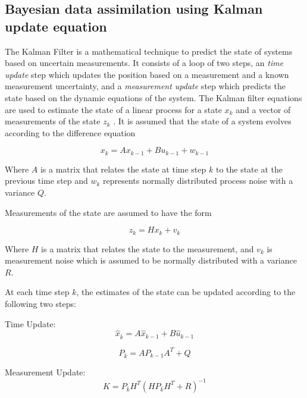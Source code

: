 \subsection{Bayesian data assimilation using Kalman update equation}\label{subsec:kalman-update}

The Kalman Filter is a mathematical technique to predict the state of systems based on uncertain measurements. It consists of a loop of two steps, an \emph{time update} step which updates the position based on a measurement and a known measurement uncertainty, and a \emph{measurement update} step which predicts the state based on the dynamic equations of the system. The Kalman filter equations are used to estimate the state of a linear process for a state $x_k$ and a vector of measurements of the state $z_k$ \parencite{Welch2021a}.  It is assumed that the state of a system evolves according to the difference equation

\begin{equation}
 x_k = Ax_{k-1} + Bu_{k-1} + w_{k-1}   
\end{equation}

Where $A$ is a matrix that relates the state at time step $k$ to the state at the previous time step and $w_k$ represents normally distributed process noise with a variance $Q$.  

Measurements of the state are assumed to have the form

\begin{equation}
    z_k = Hx_k + v_k
\end{equation}

Where $H$ is a matrix that relates the state to the measurement, and  $v_k$ is measurement noise which is assumed to be normally distributed with a variance $R$.

At each time step $k$, the estimates of the state can be updated according to the following two steps:

Time Update:
\begin{equation}\label{eq:timeup1}
    \hat{x}_{\bar{k}} = A\hat{x}_{k-1} + B\hat{u}_{k-1}
\end{equation}

\begin{equation}\label{eq:timeup2}
    P_{\bar{k}} = A P_{k-1} A^T + Q
\end{equation}

Measurement Update:
\begin{equation}\label{eq:kalmangain}
    K = P_{\bar{k}} H^T(H P_{\bar{k}} H^T + R) ^{-1}
\end{equation}


